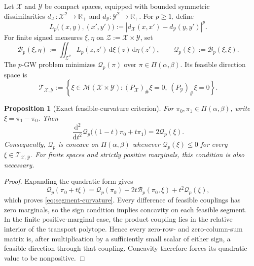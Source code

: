 \documentclass[11pt,a4paper]{article}
\newtheorem{proposition}[theorem]{Proposition}
\theoremstyle{definition}
\theoremstyle{remark}
\newcommand{\R}{\mathbb R}
\newcommand{\Mcal}{\mathcal M}
\newcommand{\Tcal}{\mathcal T}
\newcommand{\Qcal}{\mathcal Q}
\newcommand{\Bcal}{\mathcal B}
\newcommand{\Piopt}{\Pi}
\newcommand{\dd}{\,\mathrm d}
\newcommand{\abs}[1]{\left\lvert #1\right\rvert}
\begin{document}
Let \(\mathcal X\) and \(\mathcal Y\) be compact spaces, equipped with bounded
symmetric dissimilarities
\(d_{\mathcal X}:\mathcal X^2\to\R_+\) and
\(d_{\mathcal Y}:\mathcal Y^2\to\R_+\).  For \(p\geq1\), define
\begin{equation}
  L_p\bigl((x,y),(x',y')\bigr)
  :=
  \abs{d_{\mathcal X}(x,x')-d_{\mathcal Y}(y,y')}^p.
  \label{eq:lp-kernel}
\end{equation}
For finite signed measures \(\xi,\eta\) on
\(\mathcal Z:=\mathcal X\times\mathcal Y\), set
\begin{equation}
  \Bcal_p(\xi,\eta)
  :=\iint_{\mathcal Z^2}L_p(z,z')\dd\xi(z)\dd\eta(z'),
  \qquad
  \Qcal_p(\xi):=\Bcal_p(\xi,\xi).
  \label{eq:quadratic-form}
\end{equation}
The \(p\)-GW problem minimizes \(\Qcal_p(\pi)\) over
\(\pi\in\Piopt(\alpha,\beta)\).  Its feasible direction space is
\begin{equation}
  \Tcal_{\mathcal X,\mathcal Y}
  :=
  \left\{\xi\in\Mcal(\mathcal X\times\mathcal Y):
  (P_{\mathcal X})_\#\xi=0,\ (P_{\mathcal Y})_\#\xi=0\right\}.
  \label{eq:tangent-space}
\end{equation}

\begin{proposition}[Exact feasible-curvature criterion]
\label{prop:curvature-criterion}
For \(\pi_0,\pi_1\in\Piopt(\alpha,\beta)\), write
\(\xi=\pi_1-\pi_0\).  Then
\begin{equation}
  \frac{\mathrm d^2}{\mathrm dt^2}
  \Qcal_p\bigl((1-t)\pi_0+t\pi_1\bigr)
  =2\Qcal_p(\xi).
  \label{eq:segment-curvature}
\end{equation}
Consequently, \(\Qcal_p\) is concave on
\(\Piopt(\alpha,\beta)\) whenever
\(\Qcal_p(\xi)\leq0\) for every
\(\xi\in\Tcal_{\mathcal X,\mathcal Y}\).  For finite spaces and strictly
positive marginals, this condition is also necessary.
\end{proposition}

\begin{proof}
Expanding the quadratic form gives
\[
  \Qcal_p(\pi_0+t\xi)
  =\Qcal_p(\pi_0)+2t\Bcal_p(\pi_0,\xi)+t^2\Qcal_p(\xi),
\]
which proves \eqref{eq:segment-curvature}.  Every difference of feasible
couplings has zero marginals, so the sign condition implies concavity on each
feasible segment.  In the finite positive-marginal case, the product coupling
lies in the relative interior of the transport polytope.  Hence every
zero-row- and zero-column-sum matrix is, after multiplication by a sufficiently
small scalar of either sign, a feasible direction through that coupling.
Concavity therefore forces its quadratic value to be nonpositive.
\end{proof}
\end{document}

